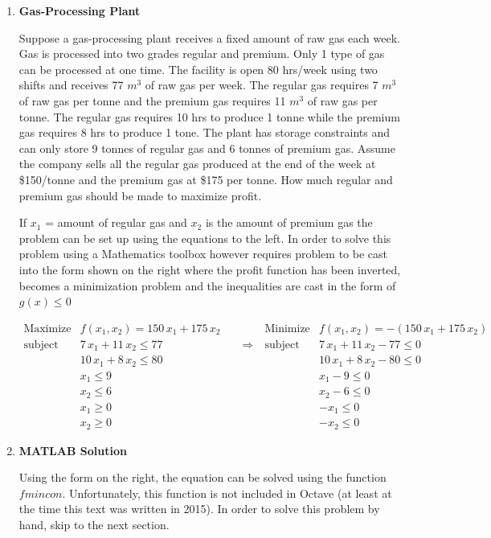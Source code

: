 \begin{enumerate}

\item {\bf Gas-Processing Plant}

  Suppose a gas-processing plant receives a fixed amount of raw gas
  each week. Gas is processed into two grades regular and
  premium. Only 1 type of gas can be processed at one time. The
  facility is open 80 hrs/week using two shifts and receives 77 $m^3$
  of raw gas per week. The regular gas requires 7 $m^3$ of raw gas per
  tonne and the premium gas requires 11 $m^3$ of raw gas per
  tonne. The regular gas requires 10 hrs to produce 1 tonne while the
  premium gas requires 8 hrs to produce 1 tone. The plant has storage
  constraints and can only store 9 tonnes of regular gas and 6 tonnes
  of premium gas. Assume the company sells all the regular gas
  produced at the end of the week at \$150/tonne and the premium gas
  at \$175 per tonne. How much regular and premium gas should be made
  to maximize profit.

  If $x_1$ = amount of regular gas and $x_2$ is the amount of premium
  gas the problem can be set up using the equations to the left. In
  order to solve this problem using a Mathematics toolbox however
  requires problem to be cast into the form shown on the right where
  the profit function has been inverted, becomes a minimization
  problem and the inequalities are cast in the form of $g(x) \le 0$

  $$ 
  \begin{array}{llcll}
    \mbox{Maximize}  &f(x_1,x_2) = 150\,x_1 + 175\,x_2 ~~~~~
    &&\mbox{Minimize} &f(x_1,x_2) = -(150\,x_1 + 175\,x_2) \\
    \mbox{subject to} &7\,x_1 + 11\,x_2 \le 77 &\Rightarrow ~
    &\mbox{subject to} &7\,x_1 + 11\,x_2 - 77 \le 0 \\
    & 10\,x_1 + 8\,x_2 \le 80 &&& 10\,x_1 + 8\,x_2 -80 \le 0 \\
    & x_1 \le 9  &&& x_1 - 9 \le 0 \\
    & x_2 \le 6  &&& x_2 - 6 \le 0 \\
    & x_1 \ge 0  &&& -x_1 \le 0 \\
    & x_2 \ge 0  &&& -x_2 \le 0
  \end{array}
  $$

  \item {\bf MATLAB Solution}

  Using the form on the right, the equation can be solved using the
  function $fmincon$. Unfortunately, this function is not included in
  Octave (at least at the time this text was written in 2015). In
  order to solve this problem by hand, skip to the next section.


\end{enumerate}
